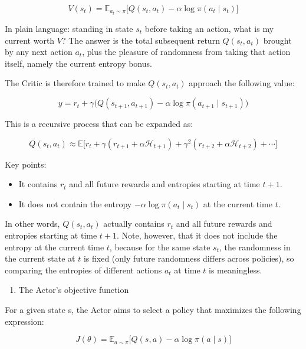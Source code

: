 \[
V(s_t)
=
\mathbb{E}_{a_t\sim\pi}
\bigl[
Q(s_t,a_t)
-
\alpha\log\pi(a_t\mid s_t)
\bigr]
\]

In plain language: standing in state \(s_t\) before taking an action, what is my current worth \(V\)? The answer is the total subsequent return \(Q(s_t,a_t)\) brought by any next action \(a_t\), plus the pleasure of randomness from taking that action itself, namely the current entropy bonus.

The Critic is therefore trained to make \(Q(s_t,a_t)\) approach the following value:

\[
y
=
r_t
+
\gamma
\bigl(
Q(s_{t+1},a_{t+1})
-
\alpha\log\pi(a_{t+1}\mid s_{t+1})
\bigr)
\]

This is a recursive process that can be expanded as:

\[
Q(s_t,a_t)
\approx
\mathbb{E}
\bigl[
r_t
+
\gamma(r_{t+1}+\alpha\mathcal{H}_{t+1})
+
\gamma^{2}(r_{t+2}+\alpha\mathcal{H}_{t+2})
+
\cdots
\bigr]
\]

Key points:

\begin{itemize}
\tightlist
\item
  It contains \(r_t\) and all future rewards and entropies starting at time \(t+1\).
\item
  It does not contain the entropy \(-\alpha\log\pi(a_t\mid s_t)\) at the current time \(t\).
\end{itemize}

In other words, \(Q(s_t,a_t)\) actually contains \(r_t\) and all future rewards and entropies starting at time \(t+1\). Note, however, that it does not include the entropy at the current time \(t\), because for the same state \(s_t\), the randomness in the current state at \(t\) is fixed (only future randomness differs across policies), so comparing the entropies of different actions \(a_t\) at time \(t\) is meaningless.

\begin{enumerate}
\def\labelenumi{\arabic{enumi}.}
\setcounter{enumi}{1}
\tightlist
\item
  The Actor's objective function
\end{enumerate}

For a given state s, the Actor aims to select a policy that maximizes the following expression:

\[
J(\theta)
=
\mathbb{E}_{a\sim\pi}
\bigl[
Q(s,a)
-
\alpha\log\pi(a\mid s)
\bigr]
\]


